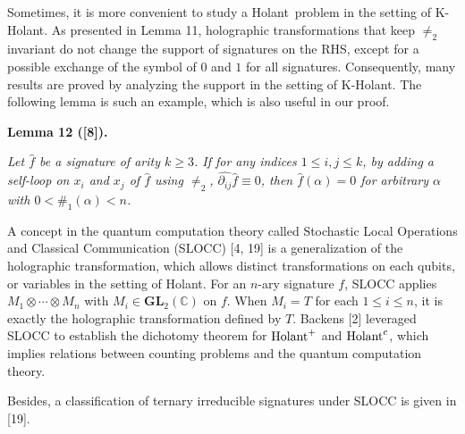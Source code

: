 \documentclass[10pt,a4paper]{article}
\begin{document}



Sometimes, it is more convenient to study a Holant problem in the setting of K-Holant. As presented in Lemma 11, holographic transformations that keep $\neq_{2}$ invariant do not change the support of signatures on the RHS, except for a possible exchange of the symbol of $0$ and $1$ for all signatures. Consequently, many results are proved by analyzing the support in the setting of K-Holant. The following lemma is such an example, which is also useful in our proof.\par





\par\medskip\noindent\textbf{
\textbf{Lemma 12}\textbf{ }([8])\textbf{.}
}\par



{\itshape Let $\widehat{f}$ be a signature of arity $k\geq 3$. If for any indices $1\leq i,j\leq k$, by adding a self-loop on $x_{i}$ and $x_{j}$ of $\widehat{f}$ using $\neq_{2}$, $\widehat{\partial_{ij}}\widehat{f}\equiv 0$, then $\widehat{f}(\alpha)=0$ for arbitrary $\alpha$ with $0<\#_{1}(\alpha)<n$.}\par






A concept in the quantum computation theory called Stochastic Local Operations and Classical Communication (SLOCC) [4, 19] is a generalization of the holographic transformation, which allows distinct transformations on each qubits, or variables in the setting of Holant. For an $n$-ary signature $f$, SLOCC applies $M_{1}\otimes\cdots\otimes M_{n}$ with $M_{i}\in\mathbf{GL}_{2}(\mathbb{C})$ on $f$. When $M_{i}=T$ for each $1\leq i\leq n$, it is exactly the holographic transformation defined by $T$. Backens [2] leveraged SLOCC to establish the dichotomy theorem for $\textup{{Holant}}^{+}$ and $\textup{{Holant}}^{c}$, which implies relations between counting problems and the quantum computation theory.\par




Besides, a classification of ternary irreducible signatures under SLOCC is given in [19].\par
\end{document}
